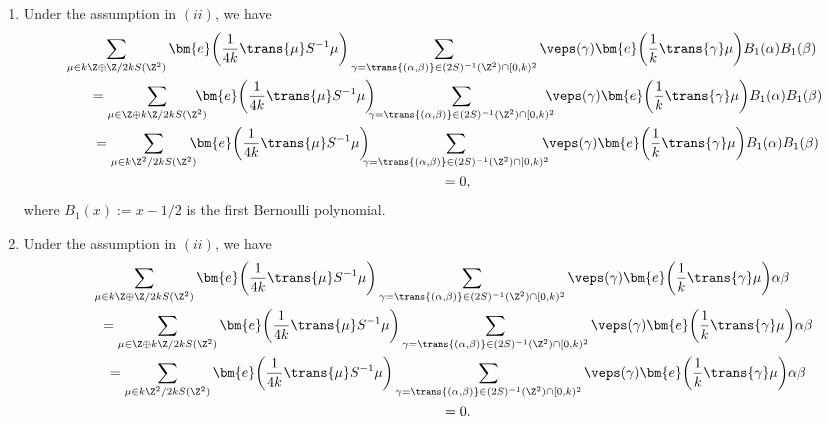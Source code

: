 \begin{prop}
\begin{enumerate}
\begin{gather*}
			\bm{e}\bigg(\frac{1}{k} {\trans{\gamma}} \mu\bigg) B(\alpha) C(\beta)
\\ \qquad
			{}= 0.
		\end{gather*}
		\item[$(iv)$] %
		Under the assumption in $(ii)$, we have
		\begin{gather*}
			\sum_{\mu \in k\Z \oplus \Z/2kS(\Z^2)} \bm{e}\bigg(\frac{1}{4k} {\trans{\mu}} S^{-1} \mu\bigg)
			\sum_{\gamma = \trans{(\alpha, \beta)} \in (2S)^{-1}(\Z^2) \cap [0, k)^2} \veps(\gamma)
			\bm{e}\bigg(\frac{1}{k} {\trans{\gamma}} \mu\bigg) B_1(\alpha) B_1(\beta)
\\ \qquad
			{}=
			\sum_{\mu \in \Z \oplus k\Z/2kS(\Z^2)}\!\!\!\!\!\! \bm{e}\bigg(\frac{1}{4k} {\trans{\mu}} S^{-1} \mu\bigg)\!\!\!\!
			\sum_{\gamma = \trans{(\alpha, \beta)} \in (2S)^{-1}(\Z^2) \cap [0, k)^2} \!\!\!\!\!\veps(\gamma)
			\bm{e}\bigg(\frac{1}{k} {\trans{\gamma}} \mu\bigg) B_1(\alpha) B_1(\beta)
\\ \qquad
			{}=
			\sum_{\mu \in k\Z^2/2kS(\Z^2)}\!\!\!\! \bm{e}\bigg(\frac{1}{4k} {\trans{\mu}} S^{-1} \mu\bigg)\!\!\!\!
			\sum_{\gamma = \trans{(\alpha, \beta)} \in (2S)^{-1}(\Z^2) \cap [0, k)^2}\!\!\!\! \veps(\gamma)
			\bm{e}\bigg(\frac{1}{k} {\trans{\gamma}} \mu\bigg) B_1(\alpha) B_1(\beta)
\\ \qquad
			{}= 0,
		\end{gather*}
		where $ B_1(x) := x - 1/2 $ is the first Bernoulli polynomial.
		\item[$(v)$] %
		Under the assumption in $(ii)$, we have
		\begin{gather*}
			\sum_{\mu \in k\Z \oplus \Z/2kS(\Z^2)} \bm{e}\bigg(\frac{1}{4k} {\trans{\mu}} S^{-1} \mu\bigg)
			\sum_{\gamma = \trans{(\alpha, \beta)} \in (2S)^{-1}(\Z^2) \cap [0, k)^2} \veps(\gamma)
			\bm{e}\bigg(\frac{1}{k} {\trans{\gamma}} \mu\bigg) \alpha \beta
\\ \qquad
			{}=
			\sum_{\mu \in \Z \oplus k\Z/2kS(\Z^2)} \bm{e}\bigg(\frac{1}{4k} {\trans{\mu}} S^{-1} \mu\bigg)
			\sum_{\gamma = \trans{(\alpha, \beta)} \in (2S)^{-1}(\Z^2) \cap [0, k)^2} \veps(\gamma)
			\bm{e}\bigg(\frac{1}{k} {\trans{\gamma}} \mu\bigg) \alpha \beta
\\ \qquad
			{}=
			\sum_{\mu \in k\Z^2/2kS(\Z^2)} \bm{e}\bigg(\frac{1}{4k} {\trans{\mu}} S^{-1} \mu\bigg)
			\sum_{\gamma = \trans{(\alpha, \beta)} \in (2S)^{-1}(\Z^2) \cap [0, k)^2} \veps(\gamma)
			\bm{e}\bigg(\frac{1}{k} {\trans{\gamma}} \mu\bigg) \alpha \beta
\\ \qquad
			{}= 0.
	\end{gather*}
	\end{enumerate}
\end{prop}

